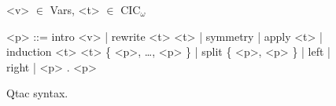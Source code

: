 \begin{figure*}
\small
\begin{grammar}
<v> $\in$ Vars, <t> $\in$ CIC$_{\omega}$

<p> ::= intro <v> \hspace{0.05cm} | \hspace{0.05cm} rewrite <t> <t> \hspace{0.05cm} | \hspace{0.05cm} symmetry \hspace{0.05cm} | \hspace{0.05cm} apply <t> \hspace{0.05cm} | \hspace{0.05cm} induction <t> <t> \{ <p>, \ldots, <p> \} \hspace{0.05cm} | \hspace{0.05cm} split \{ <p>, <p> \} \hspace{0.05cm} | \hspace{0.05cm} left \hspace{0.05cm} | \hspace{0.05cm} right \hspace{0.05cm} | \hspace{0.05cm} <p> . <p>
\end{grammar}
\vspace{-0.4cm}
\caption{Qtac syntax.}
\vspace{-0.4cm}
\label{fig:ltacsyntax1}
\end{figure*}

